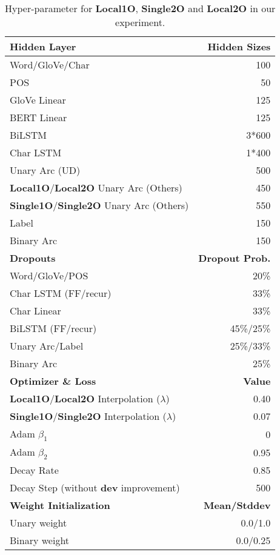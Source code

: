 \documentclass[11pt,a4paper]{article}
\begin{document}
\begin{table}[t!]
\small
\begin{center}
\begin{tabular}{lr}
\hline \hline
\textbf{Hidden Layer} & \textbf{Hidden Sizes}\\ \hline
Word/GloVe/Char & 100\\
POS & 50 \\
GloVe Linear & 125 \\
BERT Linear & 125 \\
BiLSTM & 3*600 \\
Char LSTM & 1*400 \\
Unary Arc (UD) & 500\\
\textbf{Local1O}/\textbf{Local2O} Unary Arc (Others) & 450\\
\textbf{Single1O}/\textbf{Single2O} Unary Arc (Others) & 550\\
Label & 150\\
Binary Arc & 150\\
\hline \textbf{Dropouts} & \textbf{Dropout Prob.}\\ \hline
Word/GloVe/POS & 20\%\\
Char LSTM (FF/recur) & 33\%\\
Char Linear & 33\%\\
BiLSTM (FF/recur) & 45\%/25\%\\
Unary Arc/Label & 25\%/33\%\\
Binary Arc & 25\%\\
\hline \textbf{Optimizer \& Loss} & \textbf{Value}\\ \hline
\textbf{Local1O}/\textbf{Local2O} Interpolation ($\lambda$)& 0.40\\
\textbf{Single1O}/\textbf{Single2O} Interpolation ($\lambda$)& 0.07\\
Adam $\beta_1$ & 0\\
Adam $\beta_2$ & 0.95\\
Decay Rate & 0.85 \\
Decay Step (without \textbf{dev} improvement) & 500 \\
\hline
\textbf{Weight Initialization} & \textbf{Mean/Stddev}\\
\hline
Unary weight & 0.0/1.0\\
Binary weight & 0.0/0.25\\
\hline \hline
\end{tabular}
\end{center}
\caption{Hyper-parameter for \textbf{Local1O}, \textbf{Single2O} and \textbf{Local2O} in our experiment. }
\label{tab:hyper}
\end{table}
\end{document}
